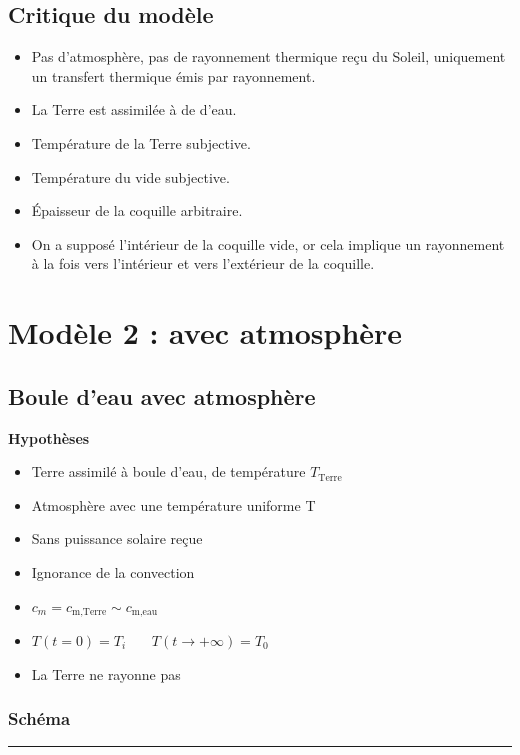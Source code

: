 \documentclass[a4paper,12pt]{article}
\begin{document}
\subsection{Critique du modèle}

\begin{itemize}
    \item Pas d’atmosphère, pas de rayonnement thermique reçu du Soleil, uniquement un transfert thermique émis par rayonnement.
    \item La Terre est assimilée à de d’eau.
    \item Température de la Terre subjective.
    \item Température du vide subjective.
    \item Épaisseur de la coquille arbitraire.
    \item On a supposé l'intérieur de la coquille vide, or cela implique un rayonnement à la fois vers l'intérieur et vers l'extérieur de la coquille.
\end{itemize}  

\newpage
\section{Modèle 2 : avec atmosphère}
\subsection{Boule d'eau avec atmosphère }
\textbf{Hypothèses}
\begin{itemize}
    \item Terre assimilé à boule d'eau, de température \(T_{\text{Terre}}\) 
    \item  Atmosphère avec une température uniforme T 
    \item  Sans puissance solaire reçue  
    \item  Ignorance de la convection  
    \item \(c_m=c_{\text{m,Terre}}\sim c_{\text{m,eau}}\) 
    \item $T(t=0) = T_i$ \ \ \
$T(t \to +\infty) = T_0$
    \item La Terre ne rayonne pas
   
\end{itemize}
\vspace{0.5cm}
\subsubsection*{Schéma} 
\noindent\textcolor{gray}{\rule{\linewidth}{0.4pt}}
\end{document}
